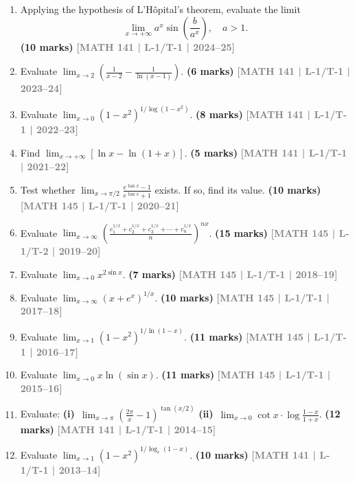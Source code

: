 \documentclass[12pt,a3paper]{article}
\newcommand{\yr}[1]{\hfill\textcolor{gray}{\small\textbf{[#1]}}}
\newcommand{\mk}[1]{\textcolor{orange!70!black}{\small\textbf{(#1 marks)}}}
\begin{document}
\begin{enumerate}

\item Applying the hypothesis of L'H\^opital's theorem, evaluate the limit
    \[
      \lim_{x\to+\infty} a^{x}\sin\!\left(\frac{b}{a^{x}}\right), \quad a>1.
    \]
\mk{10} \yr{MATH 141 | L-1/T-1 | 2024--25}    
    
\item Evaluate $\displaystyle\lim_{x\to 2}\!\left(\frac{1}{x-2}-\frac{1}{\ln(x-1)}\right)$.
\mk{6} \yr{MATH 141 | L-1/T-1 | 2023--24}

\item Evaluate $\displaystyle\lim_{x\to 0}(1-x^{2})^{1/\log(1-x^{2})}$.
\mk{8} \yr{MATH 141 | L-1/T-1 | 2022--23}

\item Find $\displaystyle\lim_{x\to+\infty}[\ln x-\ln(1+x)]$.
\mk{5} \yr{MATH 141 | L-1/T-1 | 2021--22}

\item Test whether $\displaystyle\lim_{x\to\pi/2}\frac{e^{\tan x}-1}{e^{\tan x}+1}$ exists. If so, find its value.
\mk{10} \yr{MATH 145 | L-1/T-1 | 2020--21}

\item Evaluate $\displaystyle\lim_{x\to\infty}\!\left(\frac{c_{1}^{1/x}+c_{2}^{1/x}+c_{3}^{1/x}+\cdots+c_{n}^{1/x}}{n}\right)^{nx}$.
\mk{15} \yr{MATH 145 | L-1/T-2 | 2019--20}

\item Evaluate $\displaystyle\lim_{x\to 0}x^{2\sin x}$.
\mk{7} \yr{MATH 145 | L-1/T-1 | 2018--19}

\item Evaluate $\displaystyle\lim_{x\to\infty}(x+e^{x})^{1/x}$.
\mk{10} \yr{MATH 145 | L-1/T-1 | 2017--18}

\item Evaluate $\displaystyle\lim_{x\to 1}(1-x^{2})^{1/\ln(1-x)}$.
\mk{11} \yr{MATH 145 | L-1/T-1 | 2016--17}

\item Evaluate $\displaystyle\lim_{x\to 0}x\ln(\sin x)$.
\mk{11} \yr{MATH 145 | L-1/T-1 | 2015--16}

\item Evaluate: \textbf{(i)}~$\displaystyle\lim_{x\to\pi}\!\left(\frac{2\pi}{x}-1\right)^{\!\tan(x/2)}$ \quad \textbf{(ii)}~$\displaystyle\lim_{x\to 0}\cot x\cdot\log\frac{1-x}{1+x}$.
\mk{12} \yr{MATH 141 | L-1/T-1 | 2014--15}

\item Evaluate $\displaystyle\lim_{x\to 1}(1-x^{2})^{1/\log_{e}(1-x)}$.
\mk{10} \yr{MATH 141 | L-1/T-1 | 2013--14}


\end{enumerate}
\end{document}
